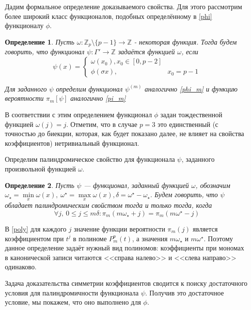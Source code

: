 \documentclass[14pt, a4paper, russian]{report}
\newtheorem{definition}{\indent Определение}
\begin{document}
Дадим формальное определение доказываемого свойства. Для этого рассмотрим более широкий класс функционалов, подобных определённому в \cref{phi} функционалу $\phi$.
\begin{definition} \label{psi}
Пусть $\omega: \mathbb{Z}_p \setminus \{p-1\} \to \mathbb{Z}$ - некоторая функция. Тогда будем говорить, что функционал $\psi: \Gamma' \to \mathbb{Z}$ задаётся функцией $\omega$, если
$$
    \psi(x) = \begin{cases}
                    \omega(x_0),x_0 \in \left[0,  p - 2\right] \\
                    \phi(\sigma x), & x_0 = p - 1
                \end{cases}
$$

Для заданного $\psi$ определим функционал $\psi^{(m)}$ аналогично \cref{phi_m} и функцию вероятности $\pi_m[\psi]$ аналогично \cref{pi_m}
\end{definition}

В соответствии с этим определением функционал $\phi$ задан тождественной функцией $\omega(j)=j$. Отметим, что в случае $p=3$ это единственный (с точностью до биекции, которая, как будет показано далее, не влияет на свойства коэффициентов) нетривиальный функционал. 

Определим палиндромическое свойство для функционала $\psi$, заданного произвольной функцией $\omega$.

\begin{definition}\label{palindromic}
Пусть $\psi$ --- функционал, заданный функцией $\omega$, обозначим $\omega_\star = \min\limits_x \omega(x),\ \omega^\star = \max\limits_x \omega(x), \delta=\omega^\star - \omega_\star$. Будем говорить, что  $\psi$  \emph{обладает палиндромическим свойством} тогда и только тогда, когда
$$
\forall j,\ 0 \le j \le m\delta:   \pi_m(m\omega_\star + j)=\pi_m(m\omega^\star-j)
$$
\end{definition}

В \cref{poly} для каждого $j$ значение функции вероятности $\pi_m(j)$ является коэффициентом при $t^j$ в полиноме $P_m^p(t)$, а значения $m\omega_\star$ и $m\omega^\star$. Поэтому данное определение задаёт нужный вид полиномов: коэффициенты при мономах в канонической записи читаются <<справа налево>> и <<слева направо>> одинаково.

Задача доказательства симметрии коэффициентов сводится к поиску достаточного условия для палиндромичности функционала $\psi$. Получив это достаточное условие, мы покажем, что оно выполнено для $\phi$.
\end{document}
